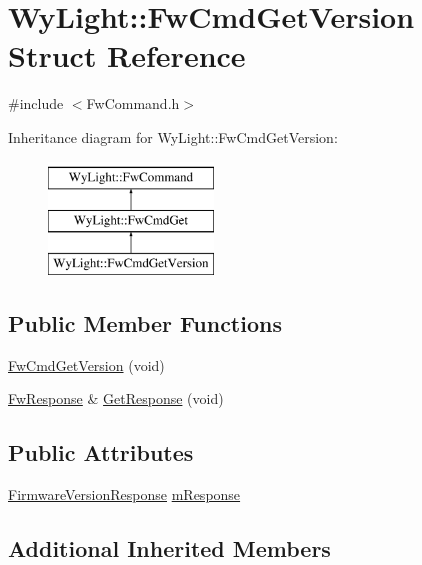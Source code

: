 \hypertarget{struct_wy_light_1_1_fw_cmd_get_version}{\section{Wy\-Light\-:\-:Fw\-Cmd\-Get\-Version Struct Reference}
\label{struct_wy_light_1_1_fw_cmd_get_version}
}


{\ttfamily \#include $<$Fw\-Command.\-h$>$}

Inheritance diagram for Wy\-Light\-:\-:Fw\-Cmd\-Get\-Version\-:\begin{figure}[H]
\begin{center}
\leavevmode
\includegraphics[height=3.000000cm]{struct_wy_light_1_1_fw_cmd_get_version}
\end{center}
\end{figure}
\subsection*{Public Member Functions}
\begin{DoxyCompactItemize}
\item 
\hyperlink{struct_wy_light_1_1_fw_cmd_get_version_a9ad3bb3337571144cf063a09d00786e2}{Fw\-Cmd\-Get\-Version} (void)
\item 
\hyperlink{class_wy_light_1_1_fw_response}{Fw\-Response} \& \hyperlink{struct_wy_light_1_1_fw_cmd_get_version_a238467662aa18499177b809d9b1d52d4}{Get\-Response} (void)
\end{DoxyCompactItemize}
\subsection*{Public Attributes}
\begin{DoxyCompactItemize}
\item 
\hyperlink{class_wy_light_1_1_firmware_version_response}{Firmware\-Version\-Response} \hyperlink{struct_wy_light_1_1_fw_cmd_get_version_aba05bc2fdb7c1aa0eb8093dc8fbe8879}{m\-Response}
\end{DoxyCompactItemize}
\subsection*{Additional Inherited Members}


